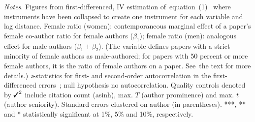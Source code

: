\begin{table}
\begin{threeparttable}
\begin{tablenotes}
            \item \textit{Notes}. Figures from first-differenced, IV estimation of~equation~(1)~\citep{Arellano1995,Blundell1998} where instruments have been collapsed to create one instrument for each variable and lag distance. Female ratio (women): contemporaneous marginal effect of a paper's female co-author ratio for female authors (\(\beta_1\)); female ratio (men): analogous effect for male authors (\(\beta_1+\beta_2\)). (The variable defines papers with a strict minority of female authors as male-authored; for papers with 50 percent or more female authors, it is the ratio of female authors on a paper. See~the text for more details.) \textit{z}-statistics for first- and second-order autocorrelation in the first-differenced errors~\citep{Arellano1991}; null hypothesis no autocorrelation. Quality controls denoted by \(\text{\ding{51}}^2\) include citation count (asinh), \(\text{max. }T\) (author prominence) and \(\text{max. }t\) (author seniority). Standard errors clustered on author (in parentheses). ***, ** and * statistically significant at 1\%, 5\% and 10\%, respectively.
        \end{tablenotes}
    \end{threeparttable}
\end{table}